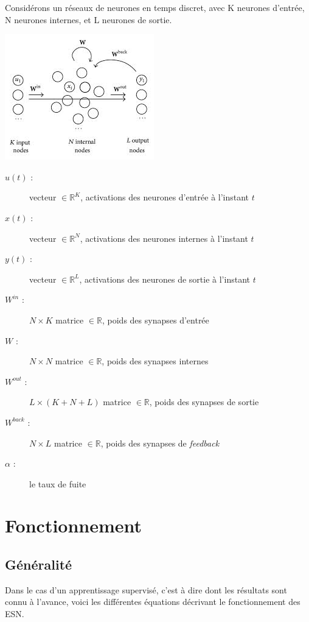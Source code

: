 \documentclass[12pt]{article}
\begin{document}
Considérons un réseaux de neurones en temps discret, avec K neurones d'entrée, N neurones internes, et L neurones de sortie.\newline
\begin{center}
\includegraphics{esn.jpeg}
\end{center}
\begin{description}
\item[$u(t)$ :] vecteur $\in \mathbb{R}^{K}$, activations des neurones d'entrée à l'instant $t$
\item[$x(t)$ :] vecteur $\in \mathbb{R}^{N}$, activations des neurones internes à l'instant $t$
\item[$y(t)$ :] vecteur $\in \mathbb{R}^{L}$, activations des neurones de sortie à l'instant $t$
\item[$W^{in}$ :] $N \times K$ matrice $\in \mathbb{R}$, poids des synapses d'entrée
\item[$W$ :] $N \times N$ matrice $\in \mathbb{R}$, poids des synapses internes
\item[$W^{out}$ :] $L \times (K + N + L)$ matrice $\in \mathbb{R}$, poids des synapses de sortie
\item[$W^{back}$ :] $N \times L$ matrice $\in \mathbb{R}$, poids des synapses de \textit{feedback}
\item[$\alpha$ :] le taux de fuite
\end{description} 

\section{Fonctionnement}

\subsection{Généralité}
Dans le cas d'un apprentissage supervisé, c'est à dire dont les résultats sont connu à l'avance, voici les différentes équations décrivant le fonctionnement des ESN.\newline
\end{document}
